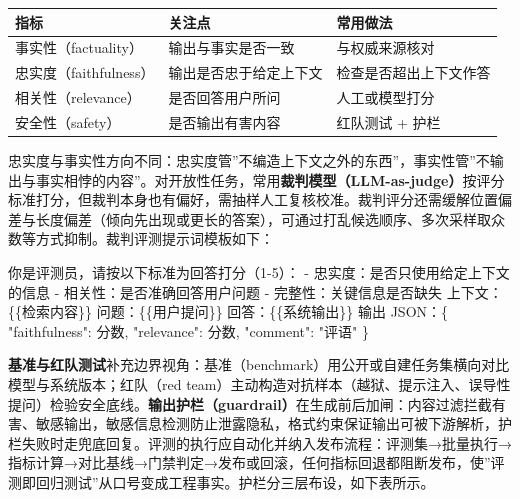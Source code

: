 \documentclass[12pt,a4paper,twoside,openany]{ctexbook}
\numberwithin{figure}{chapter}
\numberwithin{table}{chapter}
\newenvironment{Shaded}{}{}
\newcommand{\NormalTok}[1]{#1}
\newcounter{none}
\begin{document}
{\def\LTcaptype{none} %
\begin{longtable}[]{@{}
  >{\raggedright\arraybackslash}p{}
  >{\raggedright\arraybackslash}p{}
  >{\raggedright\arraybackslash}p{}@{}}
\toprule\noalign{}
\begin{minipage}[b]{\linewidth}\raggedright
指标
\end{minipage} & \begin{minipage}[b]{\linewidth}\raggedright
关注点
\end{minipage} & \begin{minipage}[b]{\linewidth}\raggedright
常用做法
\end{minipage} \\
\midrule\noalign{}
\endhead
\bottomrule\noalign{}
\endlastfoot
事实性（factuality） & 输出与事实是否一致 & 与权威来源核对 \\
忠实度（faithfulness） & 输出是否忠于给定上下文 &
检查是否超出上下文作答 \\
相关性（relevance） & 是否回答用户所问 & 人工或模型打分 \\
安全性（safety） & 是否输出有害内容 & 红队测试 + 护栏 \\
\end{longtable}
}

忠实度与事实性方向不同：忠实度管''不编造上下文之外的东西''，事实性管''不输出与事实相悖的内容''。对开放性任务，常用\textbf{裁判模型（LLM-as-judge）}按评分标准打分，但裁判本身也有偏好，需抽样人工复核校准。裁判评分还需缓解位置偏差与长度偏差（倾向先出现或更长的答案），可通过打乱候选顺序、多次采样取众数等方式抑制。裁判评测提示词模板如下：

\begin{Shaded}
\begin{Highlighting}[]
\NormalTok{你是评测员，请按以下标准为回答打分（1{-}5）：}
\NormalTok{{-} 忠实度：是否只使用给定上下文的信息}
\NormalTok{{-} 相关性：是否准确回答用户问题}
\NormalTok{{-} 完整性：关键信息是否缺失}
\NormalTok{上下文：\{\{检索内容\}\}}
\NormalTok{问题：\{\{用户提问\}\}}
\NormalTok{回答：\{\{系统输出\}\}}
\NormalTok{输出 JSON：\{ "faithfulness": 分数, "relevance": 分数, "comment": "评语" \}}
\end{Highlighting}
\end{Shaded}

\textbf{基准与红队测试}补充边界视角：基准（benchmark）用公开或自建任务集横向对比模型与系统版本；红队（red
team）主动构造对抗样本（越狱、提示注入、误导性提问）检验安全底线。\textbf{输出护栏（guardrail）}在生成前后加闸：内容过滤拦截有害、敏感输出，敏感信息检测防止泄露隐私，格式约束保证输出可被下游解析，护栏失败时走兜底回复。评测的执行应自动化并纳入发布流程：评测集→批量执行→指标计算→对比基线→门禁判定→发布或回滚，任何指标回退都阻断发布，使''评测即回归测试''从口号变成工程事实。护栏分三层布设，如下表所示。
\end{document}
